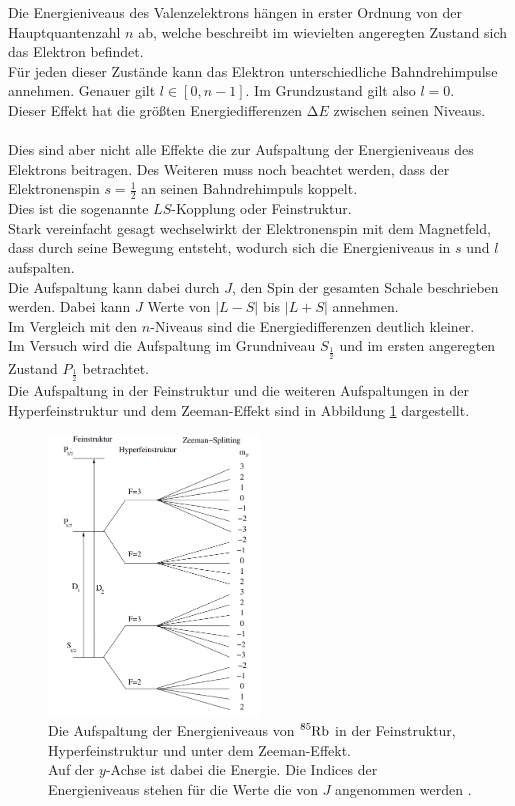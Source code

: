 \noindent
Die Energieniveaus des Valenzelektrons hängen in erster Ordnung von der Hauptquantenzahl $n$ ab, welche beschreibt im wievielten angeregten Zustand sich das Elektron befindet.\\
Für jeden dieser Zustände kann das Elektron unterschiedliche Bahndrehimpulse annehmen. Genauer gilt $l \in [0, n-1]$. Im Grundzustand gilt also $l = 0$.\\
Dieser Effekt hat die größten Energiedifferenzen $\increment E$ zwischen seinen Niveaus.\\\\
Dies sind aber nicht alle Effekte die zur Aufspaltung der Energieniveaus des Elektrons beitragen.
Des Weiteren muss noch beachtet werden, dass der Elektronenspin $s =\frac{1}{2}$ an seinen Bahndrehimpuls koppelt.\\
Dies ist die sogenannte $LS$-Kopplung oder Feinstruktur. \\
Stark vereinfacht gesagt wechselwirkt der Elektronenspin mit dem Magnetfeld, dass durch seine Bewegung entsteht, wodurch sich die Energieniveaus in $s$ und $l$ aufspalten.\\
Die Aufspaltung kann dabei durch $J$, den Spin der gesamten Schale beschrieben werden. Dabei kann $J$ Werte von $\bigl| L - S \bigr|$ bis $\bigl| L + S \bigr|$ annehmen.\\
Im Vergleich mit den $n$-Niveaus sind die Energiedifferenzen deutlich kleiner.\\
Im Versuch wird die Aufspaltung im Grundniveau $S_{\frac{1}{2}}$ und im ersten angeregten Zustand $P_\frac{1}{2}$ betrachtet.\\
Die Aufspaltung in der Feinstruktur und die weiteren Aufspaltungen in der Hyperfeinstruktur und dem Zeeman-Effekt sind in Abbildung \ref{img:aufspaltung} dargestellt.
\begin{figure}[H]
    \centering
    \includegraphics[width=0.5\textwidth]{latex/images/energy_levels_85.PNG}
    \caption{Die Aufspaltung der Energieniveaus von $\ce{^{85}Rb}$ in der Feinstruktur, Hyperfeinstruktur und unter dem Zeeman-Effekt.\\
    Auf der $y$-Achse ist dabei die Energie.
    Die Indices der Energieniveaus stehen für die Werte die von $J$ angenommen werden \protect \cite{pump_2}.}
    \label{img:aufspaltung}
\end{figure}

